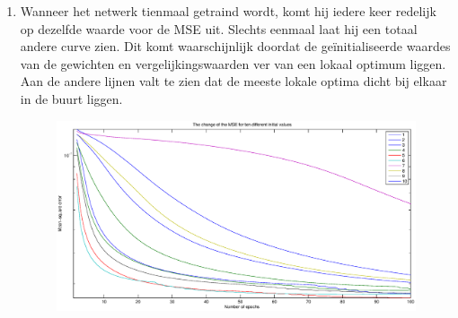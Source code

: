 \documentclass[a4paper,10pt,fleqn]{article}
\begin{document}
\begin{enumerate}[1.]
	\item Wanneer het netwerk tienmaal getraind wordt, komt hij iedere keer redelijk op dezelfde waarde voor de MSE uit. Slechts eenmaal laat hij een totaal andere curve zien. Dit komt waarschijnlijk doordat de geïnitialiseerde waardes van de gewichten en vergelijkingswaarden ver van een lokaal optimum liggen. Aan de andere lijnen valt te zien dat de meeste lokale optima dicht bij elkaar in de buurt liggen.
    \begin{figure}[!ht]
    	\centering
        \includegraphics[width=.9\textwidth]{images/train-10-times-learning_rate}
    \end{figure}


\end{enumerate}
\end{document}

